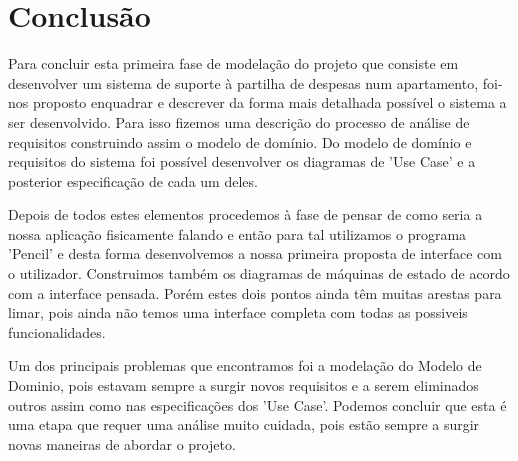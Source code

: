 \chapter{Conclusão}

Para concluir esta primeira fase de modelação do projeto que consiste em  desenvolver um sistema de suporte à partilha de despesas num apartamento, foi-nos proposto enquadrar e descrever da forma mais detalhada possível o sistema a ser desenvolvido. Para isso fizemos uma descrição do processo de análise de requisitos construindo assim o modelo de domínio.  Do modelo de domínio e requisitos do sistema foi possível desenvolver os diagramas de 'Use Case' e a posterior especificação de cada um deles. 

Depois de todos estes elementos procedemos à fase de pensar de como seria a nossa aplicação fisicamente falando e então para tal utilizamos o programa 'Pencil' e desta forma desenvolvemos a nossa primeira proposta de interface com o utilizador. Construimos também os diagramas de máquinas de estado de acordo com a interface pensada. Porém estes dois pontos ainda têm muitas arestas para limar, pois ainda não temos uma interface completa com todas as possiveis funcionalidades. 

Um dos principais problemas que encontramos foi a modelação do Modelo de Dominio, pois estavam sempre a surgir novos requisitos e a serem eliminados outros assim como nas especificações dos 'Use Case'. Podemos concluir que esta é uma etapa que requer uma análise muito cuidada, pois estão sempre a surgir novas maneiras de abordar o projeto. 





